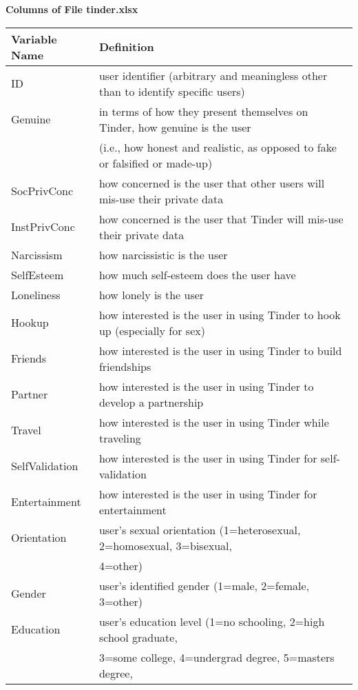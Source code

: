 \documentclass[12pt]{report}
\begin{document}
\newpage 

\large {\bf Columns of File tinder.xlsx}
\normalsize

\vspace{1em}


\begin{center}
\begin{tabular}{l l}
Variable Name & Definition\\ \hline
ID & user identifier (arbitrary and meaningless other than to identify specific users)\\ \hline
Genuine & in terms of how they present themselves on Tinder, how genuine is the user\\
  & (i.e., how honest and realistic, as opposed to fake or falsified or made-up)\\ \hline
SocPrivConc & how concerned is the user that other users will mis-use their private data\\ \hline
InstPrivConc & how concerned is the user that Tinder will mis-use their private data\\ \hline
Narcissism & how narcissistic is the user\\  \hline
SelfEsteem & how much self-esteem does the user have\\ \hline
Loneliness & how lonely is the user\\ \hline
Hookup & how interested is the user in using Tinder to hook up (especially for sex)\\ \hline
Friends & how interested is the user in using Tinder to build friendships\\ \hline
Partner & how interested is the user in using Tinder to develop a partnership\\ \hline
Travel & how interested is the user in using Tinder while traveling\\ \hline
SelfValidation & how interested is the user in using Tinder for self-validation\\ \hline
Entertainment & how interested is the user in using Tinder for entertainment\\ \hline
Orientation & user's sexual orientation (1=heterosexual, 2=homosexual, 3=bisexual,\\
&  4=other)\\  \hline
Gender & user's identified gender (1=male, 2=female, 3=other)\\ \hline
Education & user's education level (1=no schooling, 2=high school graduate,\\
          & 3=some college, 4=undergrad degree, 5=masters degree,\\

\end{tabular}
\end{center}
\end{document}
